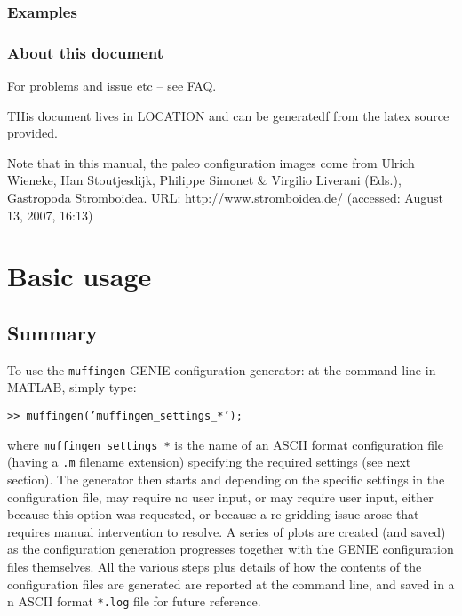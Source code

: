 \documentclass[11pt,fleqn]{book} %
\begin{document}

\subsection{Examples}



\subsection{About this document}


For problems and issue etc -- see FAQ.

THis document lives in LOCATION and can be generatedf from the latex source provided.

Note that in this manual, the paleo configuration images come from 
Ulrich Wieneke, Han Stoutjesdijk, Philippe Simonet \& Virgilio Liverani (Eds.), Gastropoda Stromboidea. URL: http://www.stromboidea.de/ (accessed: August 13, 2007, 16:13)



\chapter{Basic usage}


\section{Summary}

To use the \texttt{muffingen} GENIE configuration generator: at the command line in MATLAB, simply type:

\texttt{>> muffingen('muffingen\_settings\_*');}

\noindent where \texttt{muffingen\_settings\_*} is the name of an ASCII format configuration file (having a \texttt{.m} filename extension) specifying the required settings (see next section). The generator then starts and depending on the specific settings in the configuration file, may require no user input, or may require user input, either because this option was requested, or because a re-gridding issue arose that requires manual intervention to resolve. A series of plots are created (and saved) as the configuration generation progresses together with the GENIE configuration files themselves. All the various steps plus details of how the contents of the configuration files are generated are reported at the command line, and saved in a n ASCII format \texttt{*.log} file for future reference.
\end{document}

